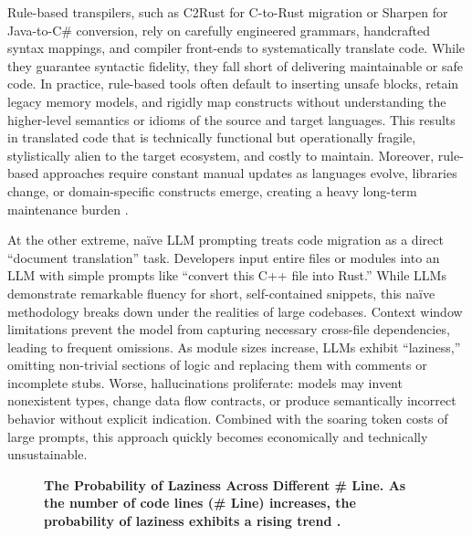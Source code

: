 \documentclass[twocolumn]{article}
\begin{document}
Rule-based transpilers, such as C2Rust for C-to-Rust migration or Sharpen for Java-to-C\# conversion, rely on carefully engineered grammars, handcrafted syntax mappings, and compiler front-ends to systematically translate code. While they guarantee syntactic fidelity, they fall short of delivering maintainable or safe code. In practice, rule-based tools often default to inserting unsafe blocks, retain legacy memory models, and rigidly map constructs without understanding the higher-level semantics or idioms of the source and target languages. This results in translated code that is technically functional but operationally fragile, stylistically alien to the target ecosystem, and costly to maintain. Moreover, rule-based approaches require constant manual updates as languages evolve, libraries change, or domain-specific constructs emerge, creating a heavy long-term maintenance burden \cite{CxGo} \cite{Sharpen} \cite{Java2CSharp}.

At the other extreme, naïve LLM prompting treats code migration as a direct ``document translation'' task. Developers input entire files or modules into an LLM with simple prompts like ``convert this C++ file into Rust.'' While LLMs demonstrate remarkable fluency for short, self-contained snippets, this naïve methodology breaks down under the realities of large codebases. Context window limitations prevent the model from capturing necessary cross-file dependencies, leading to frequent omissions. As module sizes increase, LLMs exhibit ``laziness,'' omitting non-trivial sections of logic and replacing them with comments or incomplete stubs. Worse, hallucinations proliferate: models may invent nonexistent types, change data flow contracts, or produce semantically incorrect behavior without explicit indication. Combined with the soaring token costs of large prompts, this approach quickly becomes economically and technically unsustainable.

\begin{figure}[htbp]
    \centering
    \caption{\textbf{The Probability of Laziness Across Different \# Line. As the number of code lines (\# Line) increases, the probability of laziness exhibits a rising trend \cite{liu2025llmigrate}.}}
    \label{fig:probability_of_laziness}
    \end{figure}
\end{document}
